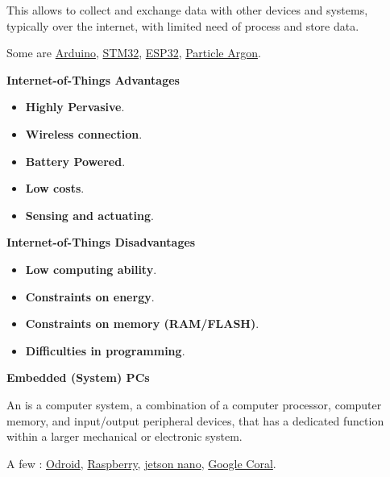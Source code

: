 \highspace
This allows to collect and exchange data with other devices and systems, typically over the internet, with limited need of process and store data.

\highspace
Some  are \href{https://www.arduino.cc/}{Arduino}, \href{https://www.st.com/en/microcontrollers-microprocessors/stm32-32-bit-arm-cortex-mcus.html}{STM32}, \href{https://en.wikipedia.org/wiki/ESP32}{ESP32}, \href{https://docs.particle.io/argon/}{Particle Argon}.

\begin{flushleft}
    \textcolor{Green3}{ \textbf{Internet-of-Things Advantages}}
\end{flushleft}
\begin{itemize}
    \item \textbf{Highly Pervasive}.
    \item \textbf{Wireless connection}.
    \item \textbf{Battery Powered}.
    \item \textbf{Low costs}.
    \item \textbf{Sensing and actuating}.
\end{itemize}

\begin{flushleft}
    \textcolor{Red2}{ \textbf{Internet-of-Things Disadvantages}}
\end{flushleft}
\begin{itemize}
    \item \textbf{Low computing ability}.
    \item \textbf{Constraints on energy}.
    \item \textbf{Constraints on memory (RAM/FLASH)}.
    \item \textbf{Difficulties in programming}.
\end{itemize}

\longline

\begin{center}
    \large
    \textcolor{Red3}{\textbf{Embedded (System) PCs}}
\end{center}

\noindent
An  is a computer system, a combination of a computer processor, computer memory, and input/output peripheral devices, that has a dedicated function within a larger mechanical or electronic system.

\highspace
A few : \href{https://www.hardkernel.com/}{Odroid}, \href{https://www.raspberrypi.com/}{Raspberry}, \href{https://developer.nvidia.com/embedded/jetson-nano}{jetson nano}, \href{https://www.coral.ai/}{Google Coral}.

